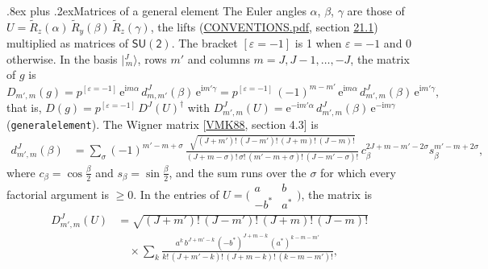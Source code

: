 \documentclass[10pt,a4paper]{article}
\makeatletter
\renewcommand\subsection{\@startsection{subsection}{2}{\z@}{-2.5ex plus -1ex minus -.2ex}%
  {.8ex plus .2ex}{\normalfont\sffamily\bfseries\color{parttitle}}}
\numberwithin{equation}{section}
\newcommand{\grp}[1]{\mathsf{#1}}
\newcommand{\iverson}[1]{[#1]}
\newcommand{\iunit}{\mathrm{i}}
\newcommand{\expe}{\mathrm{e}}
\newcommand{\wignerD}[1]{D^{#1}}
\newcommand{\wignerd}[1]{d^{#1}}
\newcommand{\conj}[1]{{#1}^{*}}
\newcommand{\jm}[2]{\bigl\lvert{}^{#1}_{\,#2}\bigr\rangle}
\newcommand{\lift}[1]{\tilde{#1}}
\makeatother
\begin{document}
\subsection{Matrices of a general element}\label{s:general}
\leavevmode\label{n:angle.euler.alpha}\label{n:angle.euler.beta}\label{n:angle.euler.gamma}The Euler angles $\alpha$, $\beta$, $\gamma$ are those of $U = \lift{R}_z(\alpha)\,\lift{R}_y(\beta)\,\lift{R}_z(\gamma)$, the lifts (\href{../../CONVENTIONS.pdf}{CONVENTIONS.pdf}, section \href{../../CONVENTIONS.pdf\#conv.21.1}{21.1}) multiplied as matrices of $\grp{SU(2)}$. The bracket $\iverson{\varepsilon = -1}$ is 1 when $\varepsilon = -1$ and 0 otherwise. \label{n:matrix.irrep.entry}In the basis $\jm{J}{m}$, rows $m'$ and columns $m = J, J-1, \dots, -J$, the matrix of $g$ is
\begin{equation}\label{e:euler}D_{m',m}(g) = p^{\iverson{\varepsilon = -1}}\,\expe^{\iunit m\alpha}\,\wignerd{J}_{m,m'}(\beta)\,\expe^{\iunit m'\gamma} = p^{\iverson{\varepsilon = -1}}\,(-1)^{m-m'}\,\expe^{\iunit m\alpha}\,\wignerd{J}_{m',m}(\beta)\,\expe^{\iunit m'\gamma},\end{equation}
\leavevmode\label{n:matrix.wigner}that is, $D(g) = p^{\iverson{\varepsilon = -1}}\,\wignerD{J}(U)^\dagger$ with $\wignerD{J}_{m',m}(U) = \expe^{-\iunit m'\alpha}\,\wignerd{J}_{m',m}(\beta)\,\expe^{-\iunit m\gamma}$ (\texttt{generalelement}). \label{n:matrix.wigner.small}\label{n:index.halfangle}\label{n:local.sum.wigner}The Wigner matrix [\href{../../../REFERENCES.pdf\#ref.VMK88}{VMK88}, section 4.3] is
\begin{equation}\label{e:wigner}\begin{aligned}\wignerd{J}_{m',m}(\beta) &= \sum_\sigma (-1)^{m'-m+\sigma}\,\frac{\sqrt{(J+m')!\,(J-m')!\,(J+m)!\,(J-m)!}}{(J+m-\sigma)!\,\sigma!\,(m'-m+\sigma)!\,(J-m'-\sigma)!}\,c_\beta^{2J+m-m'-2\sigma}s_\beta^{m'-m+2\sigma},\end{aligned}\end{equation}
where $c_\beta = \cos\tfrac{\beta}{2}$ and $s_\beta = \sin\tfrac{\beta}{2}$, and the sum runs over the $\sigma$ for which every factorial argument is $\ge 0$. \label{n:index.cayleyklein}\label{n:local.sum.cayleyklein}In the entries of $U = \bigl(\begin{smallmatrix} a & b\\ -\conj{b} & \conj{a}\end{smallmatrix}\bigr)$, the matrix is
\begin{equation}\label{e:entries}\begin{aligned}\wignerD{J}_{m',m}(U) &= \sqrt{(J+m')!\,(J-m')!\,(J+m)!\,(J-m)!}\\ &\quad\times\sum_k\frac{a^{k}\,b^{J+m'-k}\,(-\conj{b})^{J+m-k}\,(\conj{a})^{k-m-m'}}{k!\,(J+m'-k)!\,(J+m-k)!\,(k-m-m')!},\end{aligned}\end{equation}
\end{document}
